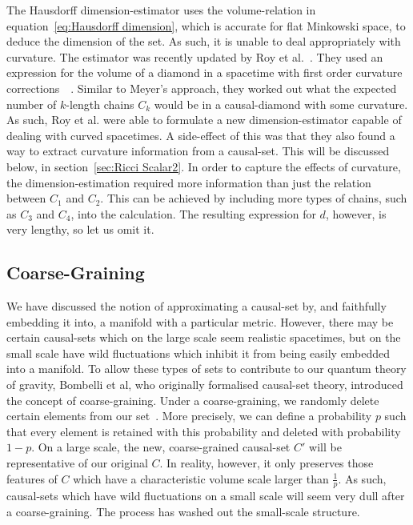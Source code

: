 \documentclass[a4paper,12pt]{article}
\numberwithin{equation}{section}
\begin{document}
The Hausdorff dimension-estimator uses the volume-relation in equation~\ref{eq:Hausdorff dimension}, which is accurate for flat Minkowski space, to deduce the dimension of the set. As such, it is unable to deal appropriately with curvature. The estimator was recently updated by Roy et al.~\cite{Roy2012}. They used an expression for the volume of a diamond in a spacetime with first order curvature corrections~\cite{Myrheim1978}~\cite{Gibbons2007}. Similar to Meyer's approach, they worked out what the expected number of $k$-length chains $C_k$ would be in a causal-diamond with some curvature. As such, Roy et al. were able to formulate a new dimension-estimator capable of dealing with curved spacetimes. A side-effect of this was that they also found a way to extract curvature information from a causal-set. This will be discussed below, in section~\ref{sec:Ricci Scalar2}. In order to capture the effects of curvature, the dimension-estimation required more information than just the relation between $C_1$ and $C_2$. This can be achieved by including more types of chains, such as $C_3$ and $C_4$, into the calculation. The resulting expression for $d$, however, is very lengthy, so let us omit it.


\subsection{Coarse-Graining}
\label{sec:Coarse-Graining}

We have discussed the notion of approximating a causal-set by, and faithfully embedding it into, a manifold with a particular metric. However, there may be certain causal-sets which on the large scale seem realistic spacetimes, but on the small scale have wild fluctuations which inhibit it from being easily embedded into a manifold. To allow these types of sets to contribute to our quantum theory of gravity, Bombelli et al, who originally formalised causal-set theory, introduced the concept of coarse-graining. Under a coarse-graining, we randomly delete certain elements from our set~\cite{Bombelli1987}. More precisely, we can define a probability $p$ such that every element is retained with this probability and deleted with probability $1-p$. On a large scale, the new, coarse-grained causal-set $C'$ will be representative of our original $C$. In reality, however, it only preserves those features of $C$ which have a characteristic volume scale larger than $\frac{1}{p}$. As such, causal-sets which have wild fluctuations on a small scale will seem very dull after a coarse-graining. The process has washed out the small-scale structure.
\end{document}

